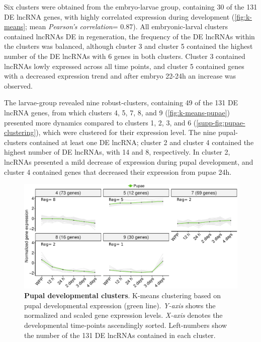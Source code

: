 Six clusters were obtained from the embryo-larvae group, containing 30 of the 131 DE lncRNA genes, with highly correlated expression during development (\autoref{fig:k-means}; mean \textit{Pearson's correlation}= 0.87). All embryonic-larval clusters contained lncRNAs DE in regeneration, the frequency of the DE lncRNAs within the clusters was balanced, although cluster 3 and cluster 5 contained the highest number of the DE lncRNAs with 6 genes in both clusters. Cluster 3 contained lncRNAs lowly expressed across all time points, and cluster 5 contained genes with a decreased expression trend and after embryo 22-24h an increase was observed. 

The larvae-group revealed nine robust-clusters, containing 49 of the 131 DE lncRNA genes, from which clusters 4, 5, 7, 8, and 9 (\autoref{fig:k-means-pupae}) presented more dynamics compared to clusters 1, 2, 3, and 6 (\autoref{supp-fig:pupae-clustering}), which were clustered for their expression level. The nine pupal-clusters contained at least one DE lncRNA; cluster 2 and cluster 4 contained the highest number of DE lncRNAs, with 14 and 8, respectively. In cluster 2, lncRNAs presented a mild decrease of expression during pupal development, and cluster 4 contained genes that decreased their expression from pupae 24h. 

\begin{figure}[ht!]
  \centering
  \includegraphics[scale=0.6]{plots/results/dme/pupae.clusters.pdf}
  \caption[Pupal developmental clusters]{\textbf{Pupal developmental clusters}. K-means clustering based on pupal developmental expression (green line). \textit{Y-axis} shows the normalized and scaled gene expression levels. \textit{X-axis} denotes the developmental time-points ascendingly sorted. Left-numbers show the number of the 131 DE lncRNAs contained in each cluster.}
  \label{fig:k-means-pupae}
\end{figure}

